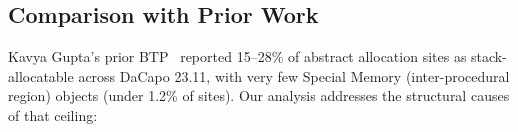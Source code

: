 \documentclass[12pt,a4paper]{article}
\begin{document}

\subsection{Comparison with Prior Work}

Kavya Gupta's prior BTP~\cite{kavya2026} reported 15--28\% of abstract allocation sites as stack-allocatable across DaCapo 23.11, with very few Special Memory (inter-procedural region) objects (under 1.2\% of sites). Our analysis addresses the structural causes of that ceiling:
\end{document}
